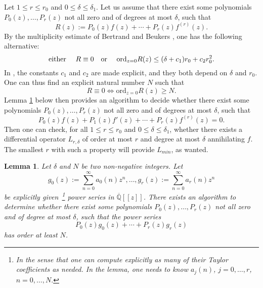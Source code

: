 \documentclass[reqno,english,12pt,a4paper]{smfart}
\newtheorem{lem}{Lemma}
\numberwithin{equation}{section}
\begin{document}
\medskip

Let $1\leq r\leq r_0$ and $0\leq \delta\leq \delta_1$. Let us assume that there exist some  polynomials 
$P_0(z),\ldots,P_r(z)$ not all zero and of degrees at most $\delta$, such that 
$$
R(z):=P_0(z)f(z) +\cdots + P_r(z)f^{(r)}(z).
$$
By the multiplicity estimate of Bertrand and Beukers \cite[Theorem 1]{BB}, one has the following alternative: 
$$
\mbox{either } \quad  R \equiv 0 \quad \mbox{or } \quad \textup{ord}_{z=0}R(z)\leq (\delta+c_1)r_0+c_2r_0^2.
$$
In \cite{BCY}, the constants $c_1$ and $c_2$ 
are made explicit, and they both depend on $\delta$ and $r_0$. One can thus find an explicit natural number 
$N$ such that 
$$
R\equiv 0 \iff \mbox{ord}_{z=0}R(z) \geq N.
$$
Lemma \ref{lem: toplitz} below then provides an algorithm to decide whether there exist some  polynomials 
$P_0(z),\ldots,P_r(z)$ not all zero and of degrees at most $\delta$, such that 
$$
P_0(z)f(z) +P_1(z)f'(z)+\cdots + P_r(z)f^{(r)}(z)=0.
$$
Then one can check, for all $1\leq r\leq r_0$ and $0\leq \delta\leq \delta_1$, 
whether there exists a differential operator $L_{r,\delta}$ of order at most $r$ and degree 
at most $\delta$ annihilating $f$. The smallest $r$ with such a property will provide $L_{min}$, as wanted.  


\begin{lem}\label{lem: toplitz} 
Let $\delta$ and $N$ be two non-negative integers. 
Let 
$$
g_0(z):=\sum_{n= 0}^{\infty}a_0(n)z^n, \ldots, g_r(z):=\sum_{n= 0}^{\infty}a_r(n)z^n
$$ 
be explicitly given~\footnote{ In the sense that one can compute explicitly as many of their Taylor coefficients as needed. In the lemma, one needs to know $a_j(n)$, $j=0,\ldots, r$, $n=0, \ldots, N.$} power series in $\overline{\mathbb Q}[[z]]$.  There exists an algorithm to determine whether 
there exist some polynomials 
$P_0(z),\ldots,P_r(z)$ not all zero and of degree at most $\delta$, such that the power series 
$$
P_0(z)g_0(z) +\cdots + P_r(z)g_r(z)
$$
has order at least $N$. 
\end{lem}
\end{document}
